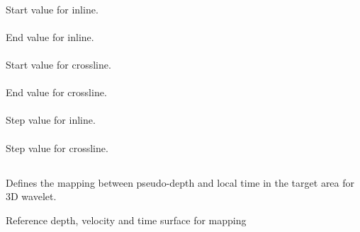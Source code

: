 \paragraph{}
 \slist
   \item \Description Start value for inline.
   \item \Argument
   \item \Default
 \elist
\paragraph{}
 \slist
   \item \Description End value for inline.
   \item \Argument
   \item \Default
 \elist
\paragraph{}
 \slist
   \item \Description Start value for crossline.
   \item \Argument
   \item \Default
 \elist
\paragraph{}
 \slist
   \item \Description End value for crossline.
   \item \Argument
   \item \Default
 \elist
\paragraph{}
 \slist
   \item \Description Step value for inline.
   \item \Argument
   \item \Default
 \elist
\paragraph{}
 \slist
   \item \Description Step value for crossline.
   \item \Argument
   \item \Default
 \elist

\subsection{} 
 \slist
   \item \Description Defines the mapping between pseudo-depth and local time in the target area for 3D wavelet.
   \item \Argument Reference depth, velocity and time surface for mapping
   \item \Default
 \elist

